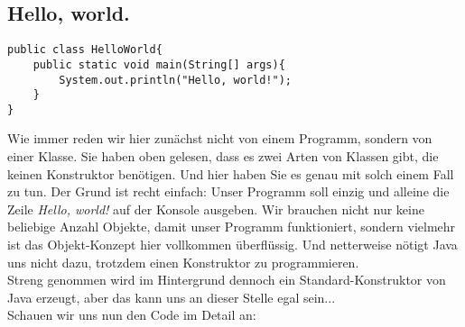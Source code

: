 \subsection{Hello, world.}

\begin{verbatim}
public class HelloWorld{
    public static void main(String[] args){
        System.out.println("Hello, world!");
    }
}
\end{verbatim}

Wie immer reden wir hier zunächst nicht von einem Programm, sondern von einer Klasse. Sie haben oben gelesen, dass es zwei Arten von Klassen gibt, die keinen Konstruktor benötigen. Und hier haben Sie es genau mit solch einem Fall zu tun. Der Grund ist recht einfach: Unser Programm soll einzig und alleine die Zeile \emph{Hello, world!} auf der Konsole ausgeben. Wir brauchen nicht nur keine beliebige Anzahl Objekte, damit unser Programm funktioniert, sondern vielmehr ist das Objekt-Konzept hier vollkommen überflüssig. Und netterweise nötigt Java uns nicht dazu, trotzdem einen Konstruktor zu programmieren.\\

Streng genommen wird im Hintergrund dennoch ein \glqq{}Standard-\grqq{}Konstruktor von Java erzeugt, aber das kann uns an dieser Stelle egal sein...\\

Schauen wir uns nun den Code im Detail an:


